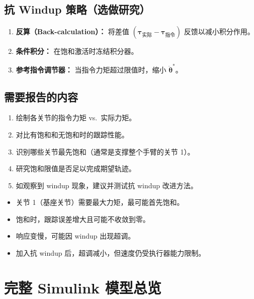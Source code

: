 \documentclass[12pt,a4paper]{ctexart}
\begin{document}
\subsection{抗 Windup 策略（选做研究）}

\begin{enumerate}[leftmargin=*]
  \item \textbf{反算（Back-calculation）：} 将差值 $(\bm{\tau}_{\text{实际}} - \bm{\tau}_{\text{指令}})$ 反馈以减小积分作用。
  \item \textbf{条件积分：} 在饱和激活时冻结积分器。
  \item \textbf{参考指令调节器：} 当指令力矩超过限值时，缩小 $\ddot{\bm{\theta}}^*$。
\end{enumerate}

\subsection{需要报告的内容}

\begin{enumerate}[leftmargin=*]
  \item 绘制各关节的指令力矩 vs.\ 实际力矩。
  \item 对比有饱和和无饱和时的跟踪性能。
  \item 识别哪些关节最先饱和（通常是支撑整个手臂的关节 1）。
  \item 研究饱和限值是否足以完成期望轨迹。
  \item 如观察到 windup 现象，建议并测试抗 windup 改进方法。
\end{enumerate}

\begin{resultbox}[预期结果]
\begin{itemize}
  \item 关节 1（基座关节）需要最大力矩，最可能首先饱和。
  \item 饱和时，跟踪误差增大且可能不收敛到零。
  \item 响应变慢，可能因 windup 出现超调。
  \item 加入抗 windup 后，超调减小，但速度仍受执行器能力限制。
\end{itemize}
\end{resultbox}

\section{完整 Simulink 模型总览}
\end{document}
